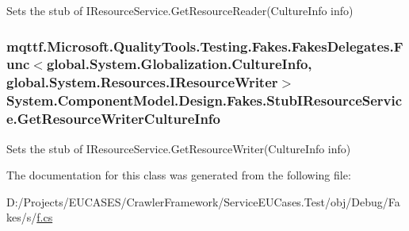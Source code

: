 Sets the stub of I\-Resource\-Service.\-Get\-Resource\-Reader(\-Culture\-Info info)

\hypertarget{class_system_1_1_component_model_1_1_design_1_1_fakes_1_1_stub_i_resource_service_a64f2c2fe1cb85fa309456d71ad684133}{
\subsubsection[{Get\-Resource\-Writer\-Culture\-Info}]{\setlength{\rightskip}{0pt plus 5cm}mqttf.\-Microsoft.\-Quality\-Tools.\-Testing.\-Fakes.\-Fakes\-Delegates.\-Func$<$global.\-System.\-Globalization.\-Culture\-Info, global.\-System.\-Resources.\-I\-Resource\-Writer$>$ System.\-Component\-Model.\-Design.\-Fakes.\-Stub\-I\-Resource\-Service.\-Get\-Resource\-Writer\-Culture\-Info}}\label{class_system_1_1_component_model_1_1_design_1_1_fakes_1_1_stub_i_resource_service_a64f2c2fe1cb85fa309456d71ad684133}


Sets the stub of I\-Resource\-Service.\-Get\-Resource\-Writer(\-Culture\-Info info)



The documentation for this class was generated from the following file\-:\begin{DoxyCompactItemize}
\item 
D\-:/\-Projects/\-E\-U\-C\-A\-S\-E\-S/\-Crawler\-Framework/\-Service\-E\-U\-Cases.\-Test/obj/\-Debug/\-Fakes/s/\hyperlink{s_2f_8cs}{f.\-cs}\end{DoxyCompactItemize}
